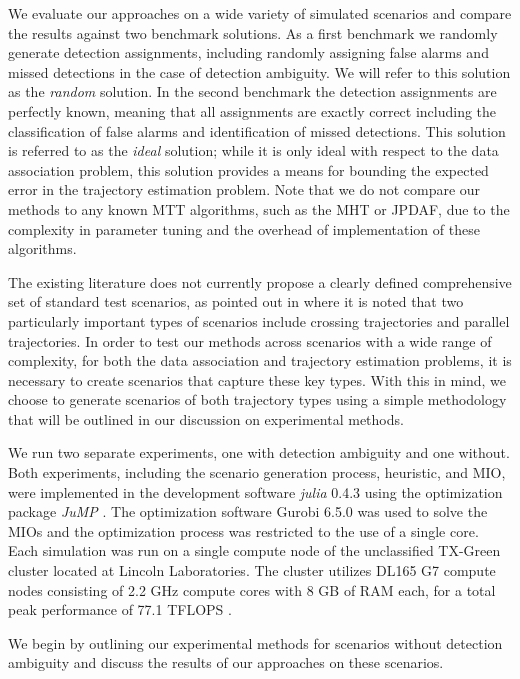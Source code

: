 We evaluate our approaches on a wide variety of simulated scenarios and compare the results against two benchmark solutions. As a first benchmark we randomly generate detection assignments, including randomly assigning false alarms and missed detections in the case of detection ambiguity. We will refer to this solution as the \textit{random} solution. In the second benchmark the detection assignments are perfectly known, meaning that all assignments are exactly correct including the classification of false alarms and identification of missed detections. This solution is referred to as the \textit{ideal} solution; while it is only ideal with respect to the data association problem, this solution provides a means for bounding the expected error in the trajectory estimation problem. Note that we do not compare our methods to any known MTT algorithms, such as the MHT or JPDAF, due to the complexity in parameter tuning and the overhead of implementation of these algorithms. 

The existing literature does not currently propose a clearly defined comprehensive set of standard test scenarios, as pointed out in \cite{MTT-Taxonomy} where it is noted that two particularly important types of scenarios include crossing trajectories and parallel trajectories. In order to test our methods across scenarios with a wide range of complexity, for both the data association and trajectory estimation problems, it is necessary to create scenarios that capture these key types. With this in mind, we choose to generate scenarios of both trajectory types using a simple methodology that will be outlined in our discussion on experimental methods. 

We run two separate experiments, one with detection ambiguity and one without. Both experiments, including the scenario generation process, heuristic, and MIO, were implemented in the development software \textit{julia} 0.4.3 \cite{julia} using the optimization package \textit{JuMP} \cite{JuMP}. The optimization software Gurobi 6.5.0 \cite{gurobi} was used to solve the MIOs and the optimization process was restricted to the use of a single core. Each simulation was run on a single compute node of the unclassified TX-Green cluster located at Lincoln Laboratories. The cluster utilizes DL165 G7 compute nodes consisting of 2.2 GHz compute cores with 8 GB of RAM each, for a total peak performance of 77.1 TFLOPS \cite{LLGrid}. 

We begin by outlining our experimental methods for scenarios without detection ambiguity and discuss the results of our approaches on these scenarios. 

